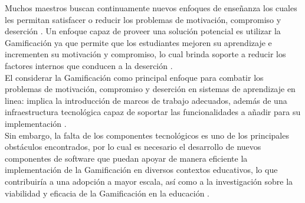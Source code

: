     
\noindent Muchos maestros buscan continuamente nuevos enfoques de enseñanza los cuales les permitan satisfacer o reducir los problemas de motivación, compromiso y deserción \cite{objetivo1}. Un enfoque capaz de proveer una solución potencial es utilizar la Gamificación ya que permite que los estudiantes mejoren su aprendizaje e incrementen su motivación y compromiso, lo cual brinda soporte a reducir los factores internos que conducen a la deserción \cite{dropoutOnline}.\\
    
\noindent El considerar la Gamificación como principal enfoque para combatir los problemas de motivación, compromiso y deserción en sistemas de aprendizaje en linea: implica la introducción de marcos de trabajo adecuados, además de una infraestructura tecnológica capaz de soportar las funcionalidades a añadir para su implementación \cite{mappingStudy}.\\
    
\noindent Sin embargo, la falta de los componentes tecnológicos es uno de los principales obstáculos encontrados, por lo cual es necesario el desarrollo de nuevos componentes de software que puedan apoyar de manera eficiente la implementación de la Gamificación en diversos contextos educativos, lo que contribuiría a una adopción a mayor escala, así como a la investigación sobre la viabilidad y eficacia de la Gamificación en la educación \cite{mappingStudy}.\\
    
    
